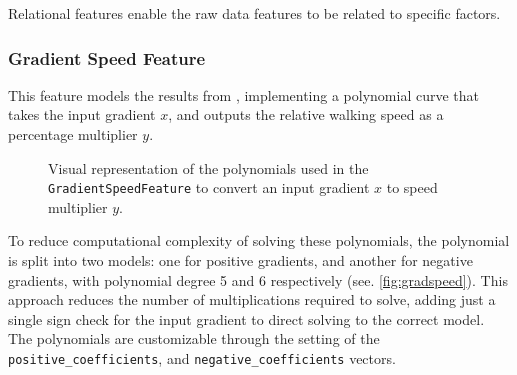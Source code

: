 \documentclass[12pt]{article}
\begin{document}
Relational features enable the raw data features to be related to specific factors.

\subsubsection{Gradient Speed Feature}

This feature models the results from \textcite{horiuchi2015comparisons}, implementing a polynomial curve that takes the input gradient $x$, and outputs the relative walking speed as a percentage multiplier $y$.

\begin{figure}[H]
  \centering
  \caption{Visual representation of the polynomials used in the \texttt{GradientSpeedFeature} to convert an input gradient $x$ to speed multiplier $y$.}
  \label{fig:gradspeed}
\end{figure}

To reduce computational complexity of solving these polynomials, the polynomial is split into two models: one for positive gradients, and another for negative gradients, with polynomial degree 5 and 6 respectively (see. \autoref{fig:gradspeed}). This approach reduces the number of multiplications required to solve, adding just a single sign check for the input gradient to direct solving to the correct model. The polynomials are customizable through the setting of the \texttt{positive\_coefficients}, and \texttt{negative\_coefficients} vectors.
\end{document}

